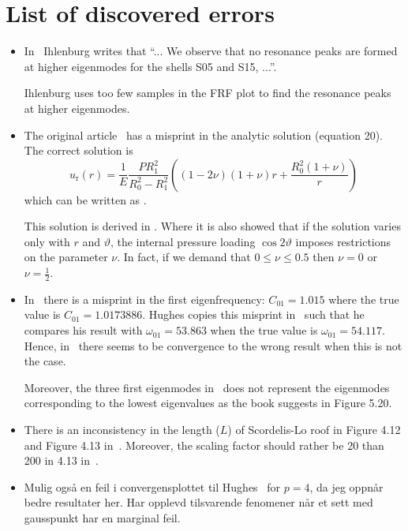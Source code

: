 
\section{List of discovered errors}


\begin{itemize}
	\item In~\cite[pp. 191-192]{Ihlenburg1998fea} Ihlenburg writes that ``... We observe that no resonance peaks are formed at higher eigenmodes for the shells S05 and S15, ...''.
	
	Ihlenburg uses too few samples in the FRF plot to find the resonance peaks at higher eigenmodes.
	
	\item The original article~\cite[p. 4156]{Hughes2005iac} has a misprint in the analytic solution (equation 20). The correct solution is
\begin{equation*}
	u_{\mathrm{r}}(r) = \frac{1}{E}\frac{P R_1^2}{R_0^2 - R_1^2}\left((1-2\nu)(1+\nu)r+\frac{R_0^2(1+\nu)}{r}\right)
\end{equation*}
which can be written as .

This solution is derived in . Where it is also showed that if the solution varies only with $r$ and $\vartheta$, the internal pressure loading $\cos 2\vartheta$ imposes restrictions on the parameter $\nu$. In fact, if we demand that $0\leq \nu\leq 0.5$ then $\nu = 0$ or $\nu = \frac12$.

\item In~\cite[p. 188]{Meirovitch1967ami} there is a misprint in the first eigenfrequency: $C_{01} = 1.015$ where the true value is $C_{01} = 1.0173886$. Hughes copies this misprint in~\cite{Hughes2005iac} such that he compares his result with $\omega_{01} = 53.863$ when the true value is $\omega_{01} = 54.117$. Hence, in~\cite{Cottrell2009iat} there seems to be convergence to the wrong result when this is not the case.

Moreover, the three first eigenmodes in~\cite{Hughes2005iac} does not represent the eigenmodes corresponding to the lowest eigenvalues as the book suggests in Figure 5.20.

\item There is an inconsistency in the length ($L$) of Scordelis-Lo roof in Figure 4.12 and Figure 4.13 in~\cite[pp. 125-126]{Cottrell2009iat}. Moreover, the scaling factor should rather be 20 than 200 in 4.13 in~\cite[p. 126]{Cottrell2009iat}.

\item Mulig også en feil i convergensplottet til Hughes~\cite[p. 129]{Cottrell2009iat} for $p=4$, da jeg oppnår bedre resultater her. Har opplevd tilsvarende fenomener når et sett med gausspunkt har en marginal feil.

\end{itemize}